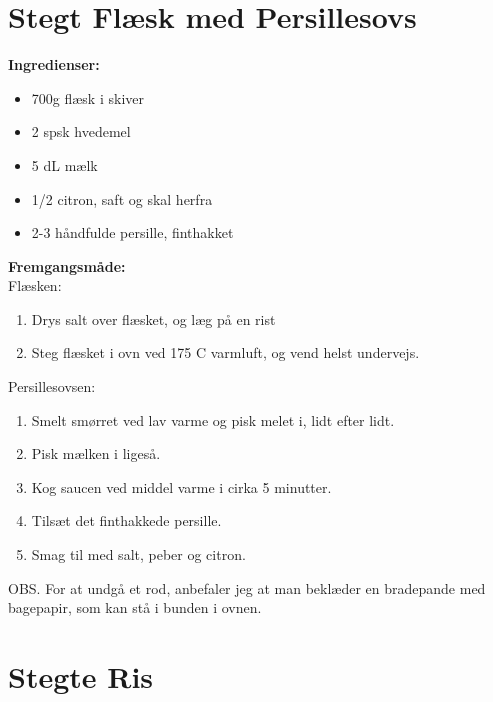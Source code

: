 \documentclass{book}
\begin{document}
\newpage \section{Stegt Flæsk med Persillesovs}
\begin{minipage}[t]{0.5\textwidth}
\textbf{Ingredienser:}
\begin{itemize}
    \item 700g flæsk i skiver
    \item 2 spsk hvedemel
    \item 5 dL mælk
    \item 1/2 citron, saft og skal herfra
    \item 2-3 håndfulde persille, finthakket
\end{itemize}
\end{minipage}
\begin{minipage}[t]{0.5\textwidth}
\textbf{Fremgangsmåde:}
\\Flæsken:
\begin{enumerate}
    \item Drys salt over flæsket, og læg på en rist
    \item Steg flæsket i ovn ved 175 \degree C varmluft, og vend helst undervejs.
\end{enumerate}
Persillesovsen:
\begin{enumerate}
    \item Smelt smørret ved lav varme og pisk melet i, lidt efter lidt.
    \item Pisk mælken i ligeså.
    \item Kog saucen ved middel varme i cirka 5 minutter.
    \item Tilsæt det finthakkede persille.
    \item Smag til med salt, peber og citron.
\end{enumerate}
\end{minipage}
OBS. For at undgå et rod, anbefaler jeg at man beklæder en bradepande med bagepapir, som kan stå i bunden i ovnen.
\newpage 
{}
\newpage \section{Stegte Ris}
\end{document}
